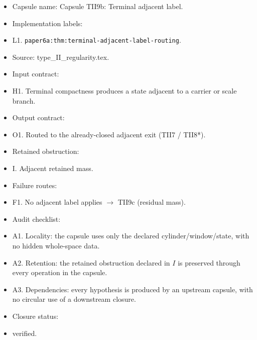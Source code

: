 \documentclass[11pt]{amsart}
\begin{document}
\begin{itemize}
  \item Capsule name: Capsule TII9b: Terminal adjacent label.
  \item Implementation labels:
  \item L1. \texttt{paper6a:thm:terminal-adjacent-label-routing}.
  \item Source: type\_II\_regularity.tex.
  \item Input contract:
  \item H1. Terminal compactness produces a state adjacent to a carrier or scale branch.
  \item Output contract:
  \item O1. Routed to the already-closed adjacent exit (TII7 / TII8*).
  \item Retained obstruction:
  \item I. Adjacent retained mass.
  \item Failure routes:
  \item F1. No adjacent label applies $\to$ TII9c (residual mass).
  \item Audit checklist:
  \item A1. Locality: the capsule uses only the declared cylinder/window/state, with no hidden whole-space data.
  \item A2. Retention: the retained obstruction declared in $I$ is preserved through every operation in the capsule.
  \item A3. Dependencies: every hypothesis is produced by an upstream capsule, with no circular use of a downstream closure.
  \item Closure status:
  \item verified.
\end{itemize}
\end{document}
